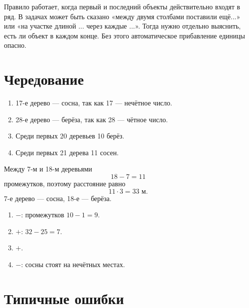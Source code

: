 \begin{teacherbox}
  Правило работает, когда первый и последний объекты действительно входят в
  ряд. В задачах может быть сказано «между двумя столбами поставили ещё...»
  или «на участке длиной ... через каждые ...». Тогда нужно отдельно выяснить,
  есть ли объект в каждом конце. Без этого автоматическое прибавление единицы
  опасно.
\end{teacherbox}

\section{Чередование}

\alternatingtreesfigure

\begin{practicebox}
  \begin{enumerate}[label=\alph*),itemsep=0.45em]
    \item 17-е дерево --- сосна, так как 17 --- нечётное число.
    \item 28-е дерево --- берёза, так как 28 --- чётное число.
    \item Среди первых 20 деревьев 10 берёз.
    \item Среди первых 21 дерева 11 сосен.
  \end{enumerate}
\end{practicebox}

\begin{thinkbox}
  Между 7-м и 18-м деревьями
  \[
    18-7=11
  \]
  промежутков, поэтому расстояние равно
  \[
    11\cdot3=33\text{ м}.
  \]
  7-е дерево --- сосна, 18-е --- берёза.
\end{thinkbox}

\begin{checkpointbox}
  \begin{enumerate}[label=\alph*),itemsep=0.4em]
    \item \(-\): промежутков \(10-1=9\).
    \item \(+\): \(32-25=7\).
    \item \(+\).
    \item \(-\): сосны стоят на нечётных местах.
  \end{enumerate}
\end{checkpointbox}

\section{Типичные ошибки}

